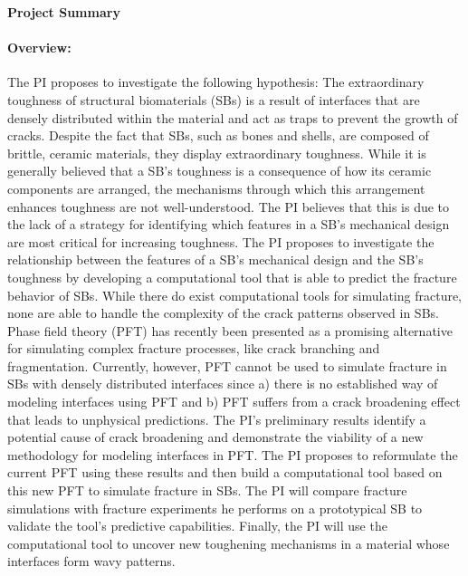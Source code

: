\documentclass[10pt,letterpaper]{article}
\begin{document}
 
\begin{center}\textbf{\large{Project Summary}}\end{center}
 
\paragraph{Overview:}
The PI proposes to investigate the following hypothesis: The extraordinary toughness of structural biomaterials (SBs) is a result of interfaces that are densely distributed within the material and act as traps to prevent the growth of cracks. Despite the fact that SBs, such as bones and shells, are composed of brittle, ceramic materials, they display extraordinary toughness. While it is generally believed that a SB's toughness is a consequence of how its ceramic components are arranged, the mechanisms through which this arrangement enhances toughness are not well-understood. The PI believes that this is due to the lack of a strategy for identifying which features in a SB's mechanical design are most critical for increasing toughness. The PI proposes to investigate the relationship between the features of a SB's mechanical design and the SB's toughness by developing a computational tool that is able to predict the fracture behavior of SBs. While there do exist computational tools for simulating fracture, none are able to handle the complexity of the crack patterns observed in SBs. Phase field theory (PFT) has recently been presented as a promising alternative for simulating complex fracture processes, like crack branching and fragmentation. Currently, however, PFT cannot be used to simulate fracture in SBs with densely distributed interfaces since a) there is no established way of modeling interfaces using PFT and b) PFT suffers from a crack broadening effect that leads to unphysical predictions. The PI's preliminary results identify a potential cause of crack broadening and demonstrate the viability of a new methodology for modeling interfaces in PFT. The PI proposes to reformulate the current PFT using these results and then build a computational tool based on this new PFT to simulate fracture in SBs.  The PI will compare fracture simulations with fracture experiments he performs on a prototypical SB to validate the tool's predictive capabilities. Finally, the PI will use the computational tool to uncover new toughening mechanisms in a material whose interfaces form wavy patterns.
\end{document}
